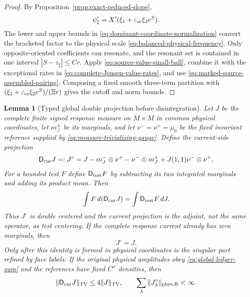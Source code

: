 \documentclass[11pt]{article}
\newtheorem{lemma}[theorem]{Lemma}
\begin{document}
\begin{proof}
By Proposition~\ref{prop:exact-reduced-slope},
\[
 \psi_\xi'=X'(\xi_1+\varepsilon_{\rm or}\xi_2e^S).
\]
The lower and upper bounds in
\eqref{eq:dominant-coordinate-normalization} convert the bracketed factor to
the physical scale \eqref{eq:balanced-physical-frequency}.  Only
opposite-oriented coefficients can resonate, and the resonant set is
contained in one interval $|S-z_\xi|\le Cr$.  Apply
\eqref{eq:source-value-small-ball}, combine it with the exceptional rates in
\eqref{eq:complete-Jensen-value-rates}, and use
\eqref{eq:marked-source-assembled-pairing}.  Composing a fixed smooth three-term
partition with
$(\xi_1+\varepsilon_{\rm or}\xi_2e^S)/(\Xi r)$ gives the cutoff and norm
bounds.
\end{proof}
\begin{lemma}[Typed global double projection before disintegration]
\label{lem:global-label-recentering}
Let $J$ be the complete finite signed response measure on $M\times M$ in
common physical coordinates, let $m_J^\pm$ be its marginals, and let
$\nu^-=\nu^+=\mu_0$ be the fixed invariant reference supplied by
\eqref{eq:measure-trivializing-gauge}.  Define the
current-side projection
\begin{equation}
\label{eq:labelwise-recentering}
 \mathsf D_{\rm cur}J=:J^\circ
 =J-m_J^-\otimes\nu^+-\nu^-\otimes m_J^+
   +J(1,1)\nu^-\otimes\nu^+.
\end{equation}
For a bounded test $F$ define $\mathsf D_{\rm test}F$ by subtracting its two
integrated marginals and adding its product mean.  Then
\[
 \int F\,d(\mathsf D_{\rm cur}J)=
 \int \mathsf D_{\rm test}F\,dJ.
\]
Thus $J^\circ$ is double centered and the current projection is the adjoint,
not the same operator, as test centering.  If the complete response current
already has zero marginals, then
\begin{equation}
\label{eq:global-recentering-sum}
 J^\circ=J.
\end{equation}
Only after this identity is formed in physical coordinates is the singular
part refined by face labels.  If the original physical amplitudes obey
\eqref{eq:global-ledger-sum} and the references have fixed $C^\alpha$
densities, then
\begin{equation}
\label{eq:recenter-norm-ledger}
 \|\mathsf D_{\rm cur}J\|_{\rm TV}
 \le4\|J\|_{\rm TV},\qquad
 \sum_\lambda\|J_\lambda^\circ\|_{\rm phys,R}<\infty .
\end{equation}
\end{lemma}
\end{document}
